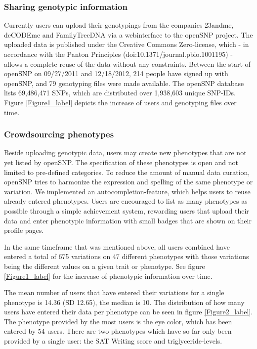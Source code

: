 \documentclass[10pt]{article}
\begin{document}
\subsubsection*{Sharing genotypic information}
Currently users can upload their genotypings from the companies 23andme, deCODEme and FamilyTreeDNA via a webinterface to the openSNP 
project. The uploaded data is published under the Creative Commons Zero-license, 
which - in accordance with the Panton Principles (doi:10.1371/journal.pbio.1001195) - 
allows a complete reuse of the data without any constraints.
Between the start of openSNP on 09/27/2011 and 12/18/2012, 214 people have signed 
up with openSNP, and 79 genotyping files were made available. The openSNP 
database lists 69,486,471 SNPs, which are distributed over 1,938,603 unique SNP-IDs.
Figure \ref{Figure1_label} depicts the increase of users and genotyping files over time.


\subsubsection*{Crowdsourcing phenotypes}
Beside uploading genotypic data, users may create new phenotypes that are not yet 
listed by openSNP. 
The specification of these phenotypes is open and not limited 
to pre-defined categories. To reduce the amount of manual data curation, openSNP tries to harmonize 
the expression and spelling of the same phenotype or variation. We implemented an 
autocompletion-feature, which helps users to reuse already entered phenotypes.
Users are encouraged to list as many phenotypes as possible through a simple 
achievement system, rewarding users that upload their data and enter phenotypic 
information with small badges that are shown on their profile pages.

In the same timeframe that was mentioned above, all users combined have 
entered a total of 675 variations on 47 different phenotypes with those variations being 
the different values on a given trait or phenotype. See figure \ref{Figure1_label} for the increase of phenotypic information over time.

The mean number of users that have entered their variations for a single phenotype 
is 14.36 (SD 12.65), the median is 10. The distribution of how many users have 
entered their data per phenotype can be seen in figure \ref{Figure2_label}. The phenotype provided 
by the most users is the eye color, which has been entered by 54 users. There are 
two phenotypes which have so far only been provided by a single user: 
the SAT Writing score and triglyceride-levels.
\end{document}
